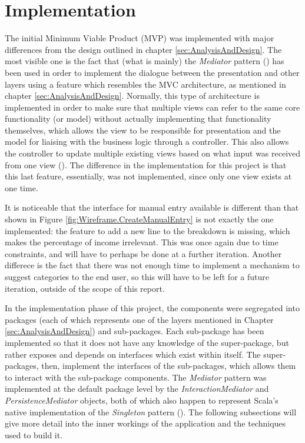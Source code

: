 \section{Implementation} \label{sec:Implementation}

The initial Minimum Viable Product (MVP) was implemented with major differences
from the design outlined in chapter \ref{sec:AnalysisAndDesign}.  The most
visible one is the fact that (what is mainly) the \emph{Mediator} pattern
(\cite[][Ch.~9,~Location~3594]{nikolov2016scala}) has been used in order to
implement the dialogue between the presentation and other layers using a
feature which resembles the MVC architecture, as mentioned in chapter
\ref{sec:AnalysisAndDesign}. Normally, this type of architecture is implemented
in order to make sure that multiple views can refer to the same core
functionality (or model) without actually implementing that functionality
themselves, which allows the view to be responsible for presentation and the
model for liaising with the business logic through a controller. This also
allows the controller to update multiple existing views based on what input was
received from one view (\cite[][p.~381]{bennett2010object}). The difference in
the implementation for this project is that this last feature, essentially, was
not implemented, since only one view exists at one time.

It is noticeable that the interface for manual entry available is different
than that shown in Figure \ref{fig:Wireframe.CreateManualEntry} is not exactly
the one implemented: the feature to add a new line to the breakdown is missing,
which makes the percentage of income irrelevant. This was once again due to
time constraints, and will have to perhaps be done at a further iteration.
Another differece is the fact that there was not enough time to implement a
mechanism to suggest categories to the end user, so this will have to be left
for a future iteration, outside of the scope of this report.

In the implementation phase of this project, the components were segregated
into packages (each of which represents one of the layers mentioned in Chapter
\ref{sec:AnalysisAndDesign}) and sub-packages. Each sub-package has been
implemented so that it does not have any knowledge of the super-package, but
rather exposes and depends on interfaces which exist within itself. The
super-packages, then, implement the interfaces of the sub-packages, which
allows them to interact with the sub-package components. The \emph{Mediator}
pattern was implemented at the default package level by the
\emph{InteractionMediator} and \emph{PersistenceMediator} objects, both of
which also happen to represent Scala's native implementation of the
\emph{Singleton} pattern (\cite[][Ch.~6,~Location.~2242]{nikolov2016scala}).
The following subsections will give more detail into the inner workings of the
application and the techniques used to build it.

